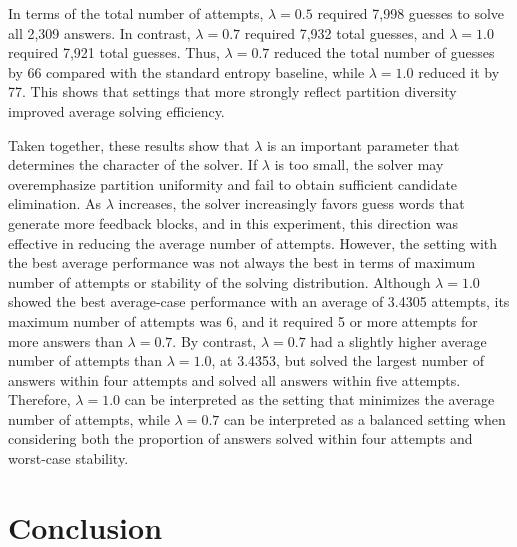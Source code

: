 \documentclass[11pt]{article}
\begin{document}
In terms of the total number of attempts, $\lambda = 0.5$ required 7,998 guesses to solve all 2,309 answers.
In contrast, $\lambda = 0.7$ required 7,932 total guesses, and $\lambda = 1.0$ required 7,921 total guesses.
Thus, $\lambda = 0.7$ reduced the total number of guesses by 66 compared with the standard entropy baseline, while $\lambda = 1.0$ reduced it by 77.
This shows that settings that more strongly reflect partition diversity improved average solving efficiency.

Taken together, these results show that $\lambda$ is an important parameter that determines the character of the solver.
If $\lambda$ is too small, the solver may overemphasize partition uniformity and fail to obtain sufficient candidate elimination.
As $\lambda$ increases, the solver increasingly favors guess words that generate more feedback blocks, and in this experiment, this direction was effective in reducing the average number of attempts.
However, the setting with the best average performance was not always the best in terms of maximum number of attempts or stability of the solving distribution.
Although $\lambda = 1.0$ showed the best average-case performance with an average of 3.4305 attempts, its maximum number of attempts was 6, and it required 5 or more attempts for more answers than $\lambda = 0.7$.
By contrast, $\lambda = 0.7$ had a slightly higher average number of attempts than $\lambda = 1.0$, at 3.4353, but solved the largest number of answers within four attempts and solved all answers within five attempts.
Therefore, $\lambda = 1.0$ can be interpreted as the setting that minimizes the average number of attempts, while $\lambda = 0.7$ can be interpreted as a balanced setting when considering both the proportion of answers solved within four attempts and worst-case stability.

































\section{Conclusion}
\label{sec:conclusion}
\end{document}
